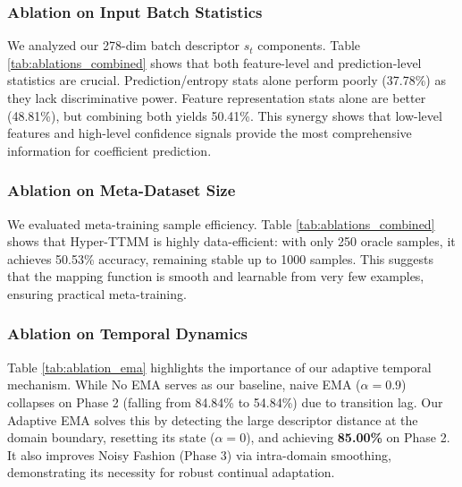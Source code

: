 \documentclass{article}
\theoremstyle{plain}
\theoremstyle{definition}
\theoremstyle{remark}
\begin{document}
\subsubsection{Ablation on Input Batch Statistics}
We analyzed our 278-dim batch descriptor $s_t$ components. Table \ref{tab:ablations_combined} shows that both feature-level and prediction-level statistics are crucial. Prediction/entropy stats alone perform poorly (37.78\%) as they lack discriminative power. Feature representation stats alone are better (48.81\%), but combining both yields 50.41\%. This synergy shows that low-level features and high-level confidence signals provide the most comprehensive information for coefficient prediction.

\subsubsection{Ablation on Meta-Dataset Size}
We evaluated meta-training sample efficiency. Table \ref{tab:ablations_combined} shows that Hyper-TTMM is highly data-efficient: with only 250 oracle samples, it achieves 50.53\% accuracy, remaining stable up to 1000 samples. This suggests that the mapping function is smooth and learnable from very few examples, ensuring practical meta-training.

\subsubsection{Ablation on Temporal Dynamics}
Table \ref{tab:ablation_ema} highlights the importance of our adaptive temporal mechanism. While No EMA serves as our baseline, naive EMA ($\alpha=0.9$) collapses on Phase 2 (falling from 84.84\% to 54.84\%) due to transition lag. Our Adaptive EMA solves this by detecting the large descriptor distance at the domain boundary, resetting its state ($\alpha=0$), and achieving \textbf{85.00\%} on Phase 2. It also improves Noisy Fashion (Phase 3) via intra-domain smoothing, demonstrating its necessity for robust continual adaptation.
\end{document}
